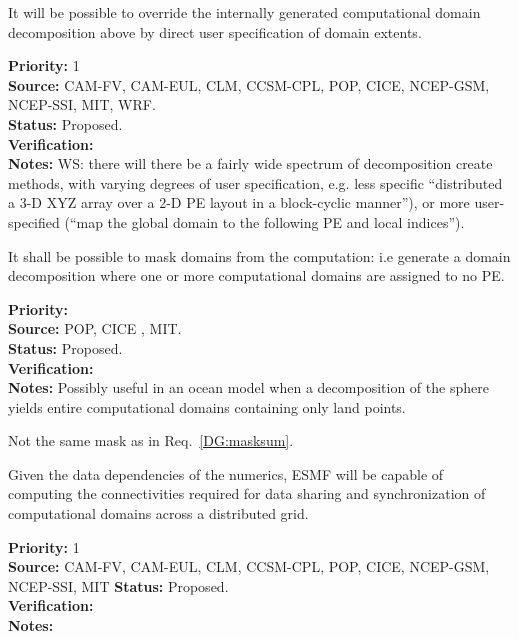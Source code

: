 
It will be possible to override the internally generated computational
domain decomposition above by direct user specification of domain
extents.

\begin{reqlist}
{\bf Priority:} 1 \\ 
{\bf Source:} CAM-FV, CAM-EUL, CLM, CCSM-CPL, POP, CICE, NCEP-GSM, NCEP-SSI, MIT, WRF. \\
{\bf Status:} Proposed. \\
{\bf Verification:} \\
{\bf Notes:} WS:  there will there be a fairly wide spectrum 
of decomposition create methods, with varying degrees of user
specification, e.g. less specific ``distributed a 3-D XYZ array 
over a 2-D PE layout in a block-cyclic manner''), or more 
user-specified (``map the global domain to the following PE 
and local indices'').

\end{reqlist}

 \label{DG:masklayout}

It shall be possible to mask domains from the computation: i.e
generate a domain decomposition where one or more computational
domains are assigned to no PE.

\begin{reqlist}
{\bf Priority:} \\
{\bf Source:} POP, CICE , MIT. \\
{\bf Status:} Proposed. \\
{\bf Verification:} \\
{\bf Notes:} Possibly useful in an ocean model when a decomposition
  of the sphere yields entire computational domains containing only
  land points.

  Not the same mask as in Req.~\ref{DG:masksum}.
\end{reqlist}


Given the data dependencies of the numerics, ESMF will be capable of
computing the connectivities required for data sharing and
synchronization of computational domains across a distributed grid.


\begin{reqlist}
{\bf Priority:} 1 \\ 
{\bf Source:} CAM-FV, CAM-EUL, CLM, CCSM-CPL, POP, CICE, NCEP-GSM, NCEP-SSI, MIT
{\bf Status:} Proposed. \\
{\bf Verification:} \\
{\bf Notes:} 

\end{reqlist}

